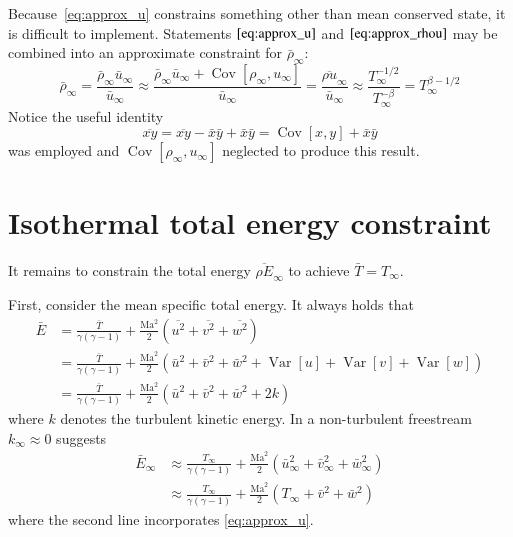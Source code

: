 \documentclass[letterpaper,11pt,nointlimits,reqno]{amsart}
\newcommand{\Mach}[1][]{\mbox{Ma}_{#1}}
\newcommand{\Cov}[2]{\ensuremath{\operatorname{Cov}\left[{#1},{#2}\right]}}
\newcommand{\Var}[1]{\ensuremath{\operatorname{Var}\left[{#1}\right]}}
\begin{document}
Because~\eqref{eq:approx_u} constrains something other than mean conserved
state, it is difficult to implement.  Statements $\eqref{eq:approx_u}$ and
$\eqref{eq:approx_rhou}$ may be combined into an approximate constraint for
$\bar{\rho}_\infty$:
\begin{equation}
  \label{eq:approx_rho}
  \bar{\rho}_\infty
  =
  \frac{\bar{\rho}_\infty \bar{u}_\infty}
       {\bar{u}_\infty}
  \approx
  \frac{\bar{\rho}_\infty \bar{u}_\infty + \Cov{\rho_\infty}{u_\infty}}
       {\bar{u}_\infty}
  =
  \frac{\overline{\rho u}_\infty}
       {\bar{u}_\infty}
  \approx
  \frac{T_\infty^{-1/2}}{T_\infty^{-\beta}}
  =
  T_\infty^{\beta-1/2}
\end{equation}
Notice the useful identity
\begin{equation}
  \label{eq:covxy}
  \overline{xy} = \overline{xy} - \bar{x} \bar{y} + \bar{x} \bar{y}
                = \Cov{x}{y} + \bar{x} \bar{y}
\end{equation}
was employed and $\Cov{\rho_\infty}{u_\infty}$ neglected to produce this
result.

\section{Isothermal total energy constraint}

It remains to constrain the total energy $\overline{\rho E}_\infty$ to achieve
$\bar{T}=T_\infty$.

First, consider the mean specific total energy.  It always holds that
\begin{align}
  \bar{E}
  &= \frac{\bar{T}}{\gamma\left( \gamma-1 \right)}
   + \frac{\Mach^2}{2}\left(\overline{u^2}+\overline{v^2}+\overline{w^2}\right)
\\
  &= \frac{\bar{T}}{\gamma\left( \gamma-1 \right)}
   + \frac{\Mach^2}{2}\left(\bar{u}^2+\bar{v}^2+\bar{w}^2
                            +\Var{u} +\Var{v} +\Var{w}\right)
\\
  &= \frac{\bar{T}}{\gamma\left( \gamma-1 \right)}
   + \frac{\Mach^2}{2}\left(\bar{u}^2+\bar{v}^2+\bar{w}^2+2 k\right)
\end{align}
where $k$ denotes the turbulent kinetic energy.  In a non-turbulent freestream
$k_\infty\approx{}0$ suggests
\begin{align}
  \bar{E}_\infty
  &\approx
     \frac{T_\infty}{\gamma\left(\gamma-1 \right)}
   + \frac{\Mach^2}{2}\left(\bar{u}_\infty^2+\bar{v}_\infty^2+\bar{w}_\infty^2\right)
\\
  \label{eq:approx_E}
  &\approx
     \frac{T_\infty}{\gamma\left(\gamma-1 \right)}
   + \frac{\Mach^2}{2}\left(T_\infty+\bar{v}^2+\bar{w}^2\right)
\end{align}
where the second line incorporates \eqref{eq:approx_u}.
\end{document}
